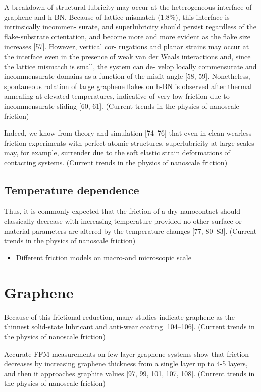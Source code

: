 A breakdown of structural lubricity may occur at the heterogeneous interface of graphene and h-BN. Because of lattice mismatch (1.8\%), this interface is intrinsically incommen- surate, and superlubricity should persist regardless of the flake-substrate orientation, and become more and more evident as the flake size increases [57]. However, vertical cor- rugations and planar strains may occur at the interface even in the presence of weak van der Waals interactions and, since the lattice mismatch is small, the system can de- velop locally commensurate and incommensurate domains as a function of the misfit angle [58, 59]. Nonetheless, spontaneous rotation of large graphene flakes on h-BN is observed after thermal annealing at elevated temperatures, indicative of very low friction due to incommensurate sliding [60, 61]. (Current trends in the physics of nanoscale friction)

Indeed, we know from theory and simulation [74–76] that even in clean wearless friction experiments with perfect atomic structures, superlubricity at large scales may, for example, surrender due to the soft elastic strain deformations of contacting systems. (Current trends in the physics of nanoscale friction)


\subsection{Temperature dependence}
Thus, it is commonly expected that the friction of a dry nanocontact should classically decrease with increasing temperature provided no other surface or material parameters are altered by the temperature changes [77, 80–83]. (Current trends in the physics of nanoscale friction)

\begin{itemize}
  \item Different friction models on macro-and microscopic scale
\end{itemize}
\section{Graphene}
Because of this frictional reduction, many studies indicate graphene as the thinnest solid-state lubricant and anti-wear coating [104–106]. (Current trends in the physics of nanoscale friction)


Accurate FFM measurements on few-layer graphene systems show that friction decreases by increasing graphene thickness from a single layer up to 4-5 layers, and then it approaches graphite values [97, 99, 101, 107, 108]. (Current trends in the physics of nanoscale friction)



